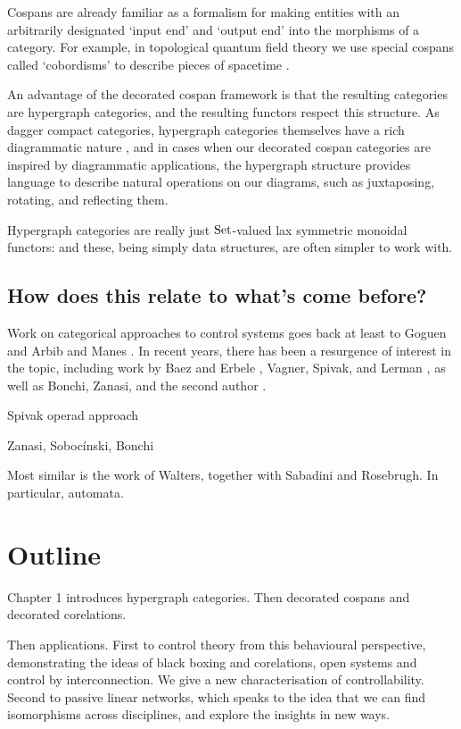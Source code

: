 Cospans are already familiar as a formalism for making entities with an
arbitrarily designated `input end' and `output end' into the morphisms of a
category.  For example, in topological quantum field theory we use special
cospans called `cobordisms' to describe pieces of spacetime \cite{BL,BaezStay}.

An advantage of the decorated cospan framework is that the resulting categories
are hypergraph categories, and the resulting functors respect this structure.
As dagger compact categories, hypergraph categories themselves have a rich
diagrammatic nature \cite{Sel11}, and in cases when our decorated cospan categories
are inspired by diagrammatic applications, the hypergraph structure provides
language to describe natural operations on our diagrams, such as juxtaposing,
rotating, and reflecting them.



Hypergraph categories are really just $\mathrm{Set}$-valued lax symmetric monoidal
functors: and these, being simply data structures, are often simpler to work
with.



\subsection*{How does this relate to what's come before?}


Work on categorical approaches to control systems goes back at least to Goguen
\cite{Go} and Arbib and Manes \cite{AM}. In recent years, there has been a
resurgence of interest in the topic, including work by Baez and Erbele
\cite{BE}, Vagner, Spivak, and Lerman \cite{VSL}, as well as Bonchi, Zanasi, and
the second author \cite{BSZ,BSZ2,BSZ3,Za}. 

Spivak operad approach

Zanasi, Soboc\'inski, Bonchi

Most similar is the work of Walters, together with Sabadini and Rosebrugh. In
particular, automata.









\section{Outline}
Chapter 1 introduces hypergraph categories. Then decorated cospans and decorated
corelations.

Then applications. First to control theory from this behavioural perspective,
demonstrating the ideas of black boxing and corelations, open systems and
control by interconnection. We give a new characterisation of controllability.
Second to passive linear networks, which speaks to the idea that we can find
isomorphisms across disciplines, and explore the insights in new ways.



